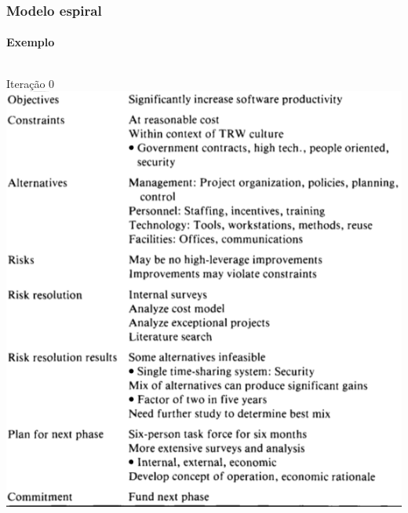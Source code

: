 \begin{frame}
	\frametitle{Modelo espiral}
	\framesubtitle{Exemplo}

	\begin{columns}
		\begin{block:fact}{Iteração 0}
			\centering
			\includegraphics[width=\textwidth]{software-engineering/project-management/process/sdlc/spiral/spiral-trw-round0-riskmanagement}
		\end{block:fact}


\end{columns}
\end{frame}

